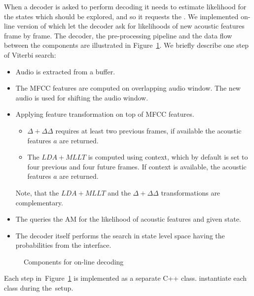 When a decoder is asked to perform decoding it needs to estimate likelihood for the states which should be explored, and so it requests the .
We implemented on-line version of  which let the decoder ask for likelihoods of new acoustic features frame by frame.
The decoder, the pre-processing pipeline and the data flow between the components are illustrated in Figure~\ref{fig:online_pipeline}.
We briefly describe one step of Viterbi search:
\begin{itemize}
    \item Audio is extracted from a buffer. 
    \item The \ac{MFCC} features are computed on overlapping audio window. The new audio is used for shifting the audio window.
    \item Applying feature transformation on top of \ac{MFCC} features. 
        \begin{itemize}
            \item $\Delta + \Delta\Delta$ requires at least two previous frames, if available the acoustic features $a$ are returned. 
            \item The $LDA+MLLT$ is computed using context, which by default is set to four previous and four future frames. If context is available, the acoustic features $a$ are returned.
        \end{itemize}
        Note, that the $LDA+MLLT$ and the $\Delta+\Delta\Delta$ transformations are complementary.
    \item The  queries the \ac{AM} for the likelihood of acoustic features and given state.
    \item The decoder itself performs the search in state level space having the probabilities from the  interface. 
\end{itemize}

\begin{figure}[!htp]
    \begin{center}
        
        \caption{Components for on-line decoding}
    \label{fig:online_pipeline} 
    \end{center}
\end{figure}

Each step in~Figure~\ref{fig:online_pipeline} is implemented as a separate C++ class.
 instantiate each class during the~setup.


